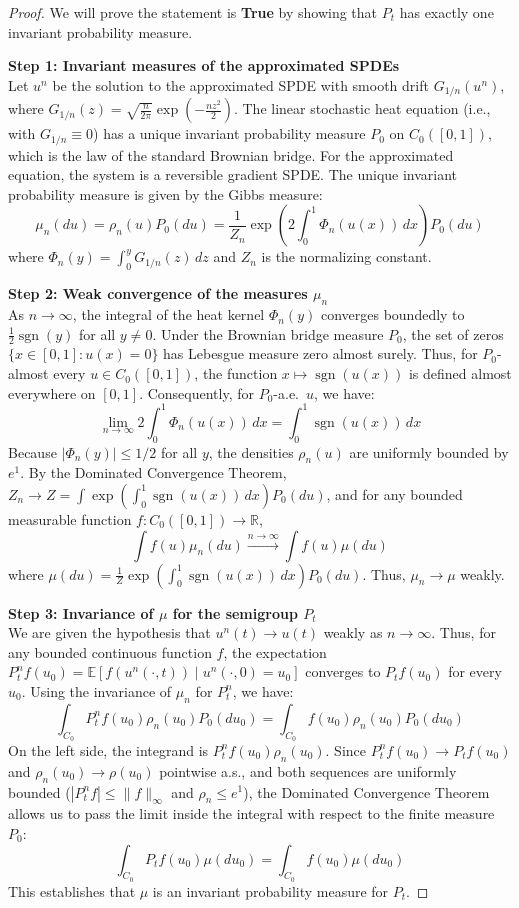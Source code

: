 \documentclass[12pt]{article}
\begin{document}
\begin{proof}
We will prove the statement is \textbf{True} by showing that $P_t$ has exactly one invariant probability measure.

\medskip\noindent
\textbf{Step 1: Invariant measures of the approximated SPDEs}\\
Let $u^n$ be the solution to the approximated SPDE with smooth drift $G_{1/n}(u^n)$, where $G_{1/n}(z) = \sqrt{\frac{n}{2\pi}} \exp\left(-\frac{n z^2}{2}\right)$. 
The linear stochastic heat equation (i.e., with $G_{1/n} \equiv 0$) has a unique invariant probability measure $P_0$ on $C_0([0,1])$, which is the law of the standard Brownian bridge. 
For the approximated equation, the system is a reversible gradient SPDE. The unique invariant probability measure is given by the Gibbs measure:
\[ \mu_n(du) = \rho_n(u) P_0(du) = \frac{1}{Z_n} \exp\left(2 \int_0^1 \Phi_n(u(x)) \, dx\right) P_0(du) \]
where $\Phi_n(y) = \int_0^y G_{1/n}(z) \, dz$ and $Z_n$ is the normalizing constant.

\medskip\noindent
\textbf{Step 2: Weak convergence of the measures $\mu_n$}\\
As $n \to \infty$, the integral of the heat kernel $\Phi_n(y)$ converges boundedly to $\frac{1}{2}\operatorname{sgn}(y)$ for all $y \neq 0$. 
Under the Brownian bridge measure $P_0$, the set of zeros $\{x \in [0,1] : u(x) = 0\}$ has Lebesgue measure zero almost surely. Thus, for $P_0$-almost every $u \in C_0([0,1])$, the function $x \mapsto \operatorname{sgn}(u(x))$ is defined almost everywhere on $[0,1]$.
Consequently, for $P_0$-a.e.\ $u$, we have:
\[ \lim_{n\to\infty} 2\int_0^1 \Phi_n(u(x)) \, dx = \int_0^1 \operatorname{sgn}(u(x)) \, dx \]
Because $|\Phi_n(y)| \le 1/2$ for all $y$, the densities $\rho_n(u)$ are uniformly bounded by $e^1$. By the Dominated Convergence Theorem, $Z_n \to Z = \int \exp\left(\int_0^1 \operatorname{sgn}(u(x)) \, dx\right) P_0(du)$, and for any bounded measurable function $f\colon C_0([0,1]) \to \mathbb{R}$,
\[ \int f(u) \mu_n(du) \xrightarrow{n \to \infty} \int f(u) \mu(du) \]
where $\mu(du) = \frac{1}{Z} \exp\left( \int_0^1 \operatorname{sgn}(u(x)) \, dx \right) P_0(du)$. Thus, $\mu_n \to \mu$ weakly.

\medskip\noindent
\textbf{Step 3: Invariance of $\mu$ for the semigroup $P_t$}\\
We are given the hypothesis that $u^n(t) \to u(t)$ weakly as $n \to \infty$. Thus, for any bounded continuous function $f$, the expectation $P^n_t f(u_0) = \mathbb{E}[f(u^n(\cdot, t)) \mid u^n(\cdot, 0) = u_0]$ converges to $P_t f(u_0)$ for every $u_0$.
Using the invariance of $\mu_n$ for $P^n_t$, we have:
\[ \int_{C_0} P^n_t f(u_0) \rho_n(u_0) P_0(du_0) = \int_{C_0} f(u_0) \rho_n(u_0) P_0(du_0) \]
On the left side, the integrand is $P^n_t f(u_0) \rho_n(u_0)$. Since $P^n_t f(u_0) \to P_t f(u_0)$ and $\rho_n(u_0) \to \rho(u_0)$ pointwise a.s., and both sequences are uniformly bounded ($|P^n_t f| \le \|f\|_\infty$ and $\rho_n \le e^1$), the Dominated Convergence Theorem allows us to pass the limit inside the integral with respect to the finite measure $P_0$:
\[ \int_{C_0} P_t f(u_0) \mu(du_0) = \int_{C_0} f(u_0) \mu(du_0) \]
This establishes that $\mu$ is an invariant probability measure for $P_t$. 


\end{proof}
\end{document}
